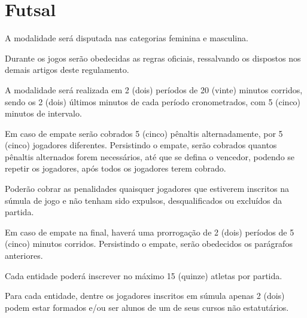 {\let\clearpage\relax \chapter{Futsal}}

\begin{article}
	A modalidade será disputada nas categorias feminina e masculina.
\end{article}

\begin{article}
	Durante os jogos serão obedecidas as regras oficiais, ressalvando os dispostos nos demais artigos deste regulamento.
\end{article}

\begin{article}
	A modalidade será realizada em 2 (dois) períodos de 20 (vinte) minutos corridos, sendo os 2 (dois) últimos minutos de cada período cronometrados, com 5 (cinco) minutos de intervalo.

	\begin{xparagraph}
		Em caso de empate serão cobrados 5 (cinco) pênaltis alternadamente, por 5 (cinco) jogadores diferentes. Persistindo o empate, serão cobrados quantos pênaltis alternados forem necessários, até que se defina o vencedor, podendo se repetir os jogadores, após todos os jogadores terem cobrado.
	\end{xparagraph}

	\begin{xparagraph}
		Poderão cobrar as penalidades quaisquer jogadores que estiverem inscritos na súmula de jogo e não tenham sido expulsos, desqualificados ou excluídos da partida.
	\end{xparagraph}

	\begin{xparagraph}
		Em caso de empate na final, haverá uma prorrogação de 2 (dois) períodos de 5 (cinco) minutos corridos. Persistindo o empate, serão obedecidos os parágrafos anteriores.
	\end{xparagraph}
\end{article}

\begin{article}
	Cada entidade poderá inscrever no máximo 15 (quinze) atletas por partida.
\end{article}

\begin{article}
	Para cada entidade, dentre os jogadores inscritos em súmula apenas 2 (dois) podem estar formados e/ou ser alunos de um de seus cursos não estatutários.
\end{article}
